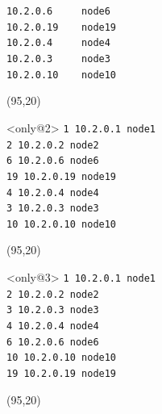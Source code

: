 \documentclass{beamer}
\begin{document}
\begin{frame}[fragile,t]
\begin{textblock}{28}
\begin{block}
    \verb;10.2.0.6     node6 ;\\
    \verb;10.2.0.19    node19;\\
    \verb;10.2.0.4     node4 ;\\
    \verb;10.2.0.3     node3 ;\\
    \verb;10.2.0.10    node10;\\
    \vspace*{0.5ex}
    \end{block}
    \end{textblock}
    \begin{textblock}{25}(95,20)
     \vspace{-0.5cm}
    \begin{block}<only@2>{\vspace*{-3ex}}
    \scriptsize
    \verb;1 10.2.0.1 node1 ;\\
    \verb;2 10.2.0.2 node2 ;\\
    \verb;6 10.2.0.6 node6 ;\\
    \verb;19 10.2.0.19 node19;\\
    \verb;4 10.2.0.4 node4 ;\\
    \verb;3 10.2.0.3 node3 ;\\
    \verb;10 10.2.0.10 node10;\\
    \vspace*{0.5ex}
    \end{block}
    \end{textblock}
    \begin{textblock}{25}(95,20)
     \vspace{-0.5cm}
    \begin{block}<only@3>{\vspace*{-3ex}}
    \scriptsize
    \verb;1 10.2.0.1 node1 ;\\
    \verb;2 10.2.0.2 node2 ;\\
    \verb;3 10.2.0.3 node3 ;\\
    \verb;4 10.2.0.4 node4 ;\\
    \verb;6 10.2.0.6 node6 ;\\
    \verb;10 10.2.0.10 node10;\\
    \verb;19 10.2.0.19 node19;\\
    \vspace*{0.5ex}
    \end{block}
    \end{textblock}
    \begin{textblock}{25}(95,20)
     \vspace{-0.5cm}

\end{textblock}
\end{frame}
\end{document}
